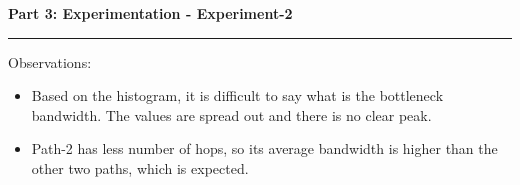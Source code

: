 \documentclass[a4paper,12pt]{article}
\newenvironment{solution}[2][]{%
    \begin{mdframed}[linecolor=blue!70!black, linewidth=2pt, roundcorner=10pt, backgroundcolor=yellow!10!white, skipabove=12pt, skipbelow=12pt]%
        \textbf{\large #2}
        \par\noindent\rule{\textwidth}{0.4pt}
}{
    \end{mdframed}
}
\begin{document}
\begin{solution}{Part 3: Experimentation - Experiment-2}
Observations:
\begin{itemize}
    \item Based on the histogram, it is difficult to say what is the bottleneck bandwidth. The values are spread out and there is no clear peak.
    \item Path-2 has less number of hops, so its average bandwidth is higher than the other two paths, which is expected.
\end{itemize}

\end{solution}
\end{document}
